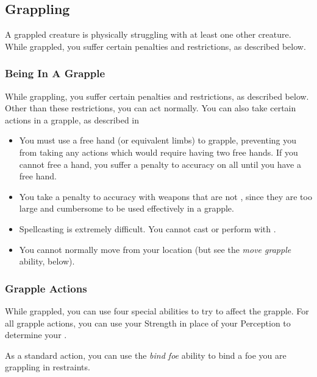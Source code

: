     \subsection{Grappling}\label{Grappling}
        A grappled creature is physically struggling with at least one other creature.
        While grappled, you suffer certain penalties and restrictions, as described below.

        \subsubsection{Being In A Grapple}
            While grappling, you suffer certain penalties and restrictions, as described below. Other than these restrictions, you can act normally. You can also take certain actions in a grapple, as described in 
            \begin{itemize}
                \item You must use a free hand (or equivalent limbs) to grapple, preventing you from taking any actions which would require having two free hands.
                    If you cannot free a hand, you suffer a  penalty to accuracy on all  until you have a free hand.
                \item You take a  penalty to accuracy with weapons that are not , since they are too large and cumbersome to be used effectively in a grapple.
                \item Spellcasting is extremely difficult. You cannot cast  or perform  with .
                \item You cannot normally move from your location (but see the \textit{move grapple} ability, below).
            \end{itemize}

        \subsubsection{Grapple Actions}\label{Grapple Actions}
            While grappled, you can use four special abilities to try to affect the grapple.
            For all grapple actions, you can use your Strength in place of your Perception to determine your .

             As a standard action, you can use the \textit{bind foe} ability to bind a foe you are grappling in restraints.

